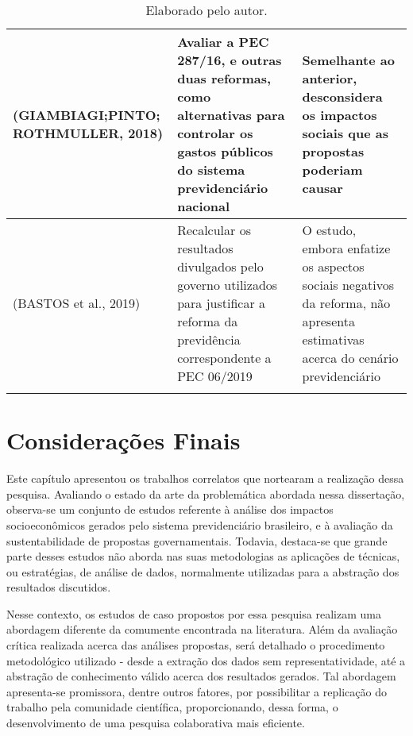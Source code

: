 \begin{longtable}{|p{}|p{}|p{}|}
\footnotesize{(GIAMBIAGI;PINTO; ROTHMULLER, 2018)} & Avaliar a PEC 287/16, e outras duas reformas, como alternativas para controlar os gastos públicos do sistema previdenciário nacional & Semelhante ao anterior, desconsidera os impactos sociais que as propostas poderiam causar \\ \hline
\footnotesize{(BASTOS et al., 2019)} & Recalcular os resultados divulgados pelo governo utilizados para justificar a reforma da previdência correspondente a PEC 06/2019 & O estudo, embora enfatize os aspectos sociais negativos da reforma, não apresenta estimativas acerca do cenário previdenciário \\ \hline
\caption*{\footnotesize{Elaborado pelo autor.}}
\label{tab:cap03:correlatos}
\end{longtable}

\section{Considerações Finais}
Este capítulo apresentou os trabalhos correlatos que nortearam a realização dessa pesquisa. Avaliando o estado da arte da problemática abordada nessa dissertação, observa-se um conjunto de estudos referente à análise dos impactos socioeconômicos gerados pelo sistema previdenciário brasileiro, e à avaliação da sustentabilidade de propostas governamentais. Todavia, destaca-se que grande parte desses estudos não aborda nas suas metodologias as aplicações de técnicas, ou estratégias, de análise de dados, normalmente utilizadas para a abstração dos resultados discutidos.

Nesse contexto, os estudos de caso propostos por essa pesquisa realizam uma abordagem diferente da comumente encontrada na literatura. Além da avaliação crítica realizada acerca das análises propostas, será detalhado o procedimento metodológico utilizado - desde a extração dos dados sem representatividade, até a abstração de conhecimento válido acerca dos resultados gerados. Tal abordagem apresenta-se promissora, dentre outros fatores, por possibilitar a replicação do trabalho pela comunidade científica, proporcionando, dessa forma, o desenvolvimento de uma pesquisa colaborativa mais eficiente.

